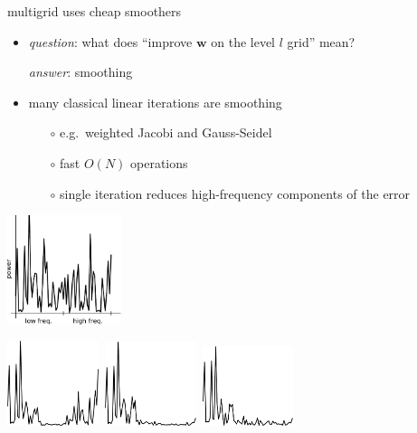 \documentclass[hide notes,intlimits,usenames,dvipsnames]{beamer}
\newcommand{\bw}{\mathbf{w}}
\begin{document}
\begin{frame}{multigrid uses cheap smoothers}

\begin{itemize}
\item \emph{question}: what does ``improve $\bw$ on the level $l$ grid'' mean?

\emph{answer}: \alert{smoothing}
\item many classical linear iterations are smoothing
	\begin{itemize}
	\item[$\circ$] e.g.~weighted Jacobi and Gauss-Seidel
	\item[$\circ$] fast $O(N)$ operations
	\item[$\circ$] single iteration reduces high-frequency components of the error
	\end{itemize}
\end{itemize}

\begin{center}
\includegraphics[width=0.25\textwidth]{figs/ps-unsmoothed}

\vspace{-3mm}


\mbox{\includegraphics[width=0.2\textwidth]{figs/ps-jacobismoothed} \qquad
\includegraphics[width=0.2\textwidth]{figs/ps-wjacobismoothed} \qquad
\includegraphics[width=0.2\textwidth]{figs/ps-gssmoothed}}
\end{center}
\end{frame}
\end{document}
